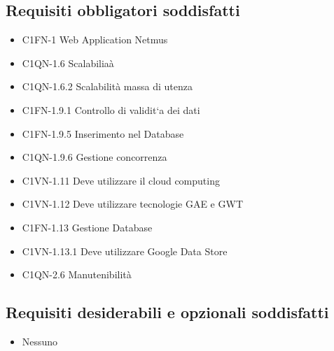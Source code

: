 \subsection*{Requisiti obbligatori soddisfatti}
\begin{itemize}
    \item C1FN-1 Web Application Netmus
    \item C1QN-1.6 Scalabilia\`a
    \item C1QN-1.6.2 Scalabilit\`a massa di utenza
    \item C1FN-1.9.1 Controllo di validit`a dei dati
	\item C1FN-1.9.5 Inserimento nel Database
	\item C1QN-1.9.6 Gestione concorrenza
	\item C1VN-1.11 Deve utilizzare il cloud computing
	\item C1VN-1.12 Deve utilizzare tecnologie GAE e GWT
	\item C1FN-1.13 Gestione Database
	\item C1VN-1.13.1 Deve utilizzare Google Data Store
	\item C1QN-2.6 Manutenibilit\`a
\end{itemize}
\subsection*{Requisiti desiderabili e opzionali soddisfatti}
\begin{itemize}
    \item Nessuno
\end{itemize}

